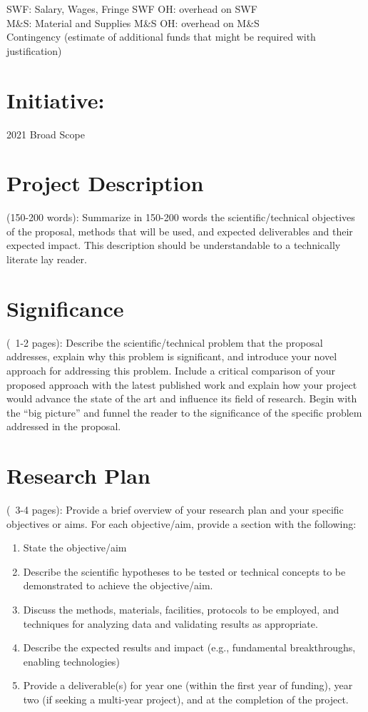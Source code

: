 \documentclass[11pt]{article}
\begin{document}
SWF: Salary, Wages, Fringe \tabto{14em} SWF OH: overhead on SWF \\
M\&S: Material and Supplies \tabto{14em} M\&S OH: overhead on M\&S \\
Contingency (estimate of additional funds that might be required with justification)

\section*{Initiative:} 2021 Broad Scope

\section*{Project Description} (150-200 words): Summarize in 150-200 words the scientific/technical objectives of the proposal, methods that will be used, and expected deliverables and their expected impact. This description should be understandable to a technically literate lay reader. 

\newpage
\section*{Significance} (~1-2 pages): Describe the scientific/technical problem that the proposal addresses, explain why this problem is significant, and introduce your novel approach for addressing this problem. Include a critical comparison of your proposed approach with the latest published work and explain how your project would advance the state of the art and influence its field of research. Begin with the “big picture” and funnel the reader to the significance of the specific problem addressed in the proposal. 

\newpage
\section*{Research Plan} (~3-4 pages): Provide a brief overview of your research plan and your specific objectives or aims. For each objective/aim, provide a section with the following:
\begin{enumerate}[label=\alph*]
\item State the objective/aim
\item Describe the scientific hypotheses to be tested or technical concepts to be demonstrated to achieve the objective/aim.
\item Discuss the methods, materials, facilities, protocols to be employed, and techniques for analyzing data and validating results as appropriate.
\item Describe the expected results and impact (e.g., fundamental breakthroughs, enabling technologies)
\item Provide a deliverable(s) for year one (within the first year of funding), year two (if seeking a multi-year project), and at the completion of the project.
\end{enumerate}
\end{document}

